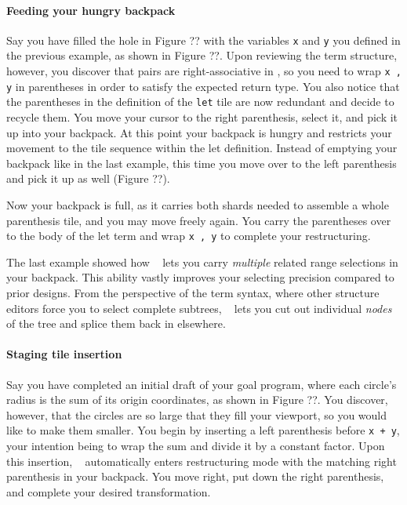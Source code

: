 \paragraph{Feeding your hungry backpack}
Say you have filled the hole in Figure ?? with
the variables \texttt{x} and \texttt{y} you defined
in the previous example, as shown in Figure ??.
Upon reviewing the term structure, however, you
discover that pairs are right-associative in \tylr,
so you need to wrap \texttt{x , y} in parentheses
in order to satisfy the expected return type.
You also notice that the parentheses in the definition
of the \texttt{let} tile are now redundant
and decide to recycle them.
You move your cursor to the right parenthesis,
select it, and pick it up into your backpack.
At this point your backpack is hungry and restricts
your movement to the tile sequence within the
let definition.
Instead of emptying your backpack like in the
last example, this time you move over to the
left parenthesis and pick it up as well (Figure ??).



Now your backpack is full, as it carries both shards
needed to assemble a whole parenthesis tile,
and you may move freely again.
You carry the parentheses over to the body of the
let term and wrap \texttt{x , y} to complete your
restructuring.

The last example showed how \tylr~ lets you carry \emph{multiple}
related range selections in your backpack.
This ability vastly improves your selecting precision
compared to prior designs.
From the perspective of the term syntax,
where other structure editors force you to select
complete subtrees, \tylr~ lets you cut out individual
\emph{nodes} of the tree and splice them back in
elsewhere.

\paragraph{Staging tile insertion}

Say you have completed an initial draft of your goal program,
where each circle's radius is the sum of its origin
coordinates, as shown in Figure ??.
You discover, however, that the circles are so large that
they fill your viewport, so you would like to make them smaller.
You begin by inserting a left parenthesis
before \texttt{x + y}, your intention being to wrap
the sum and divide it by a constant factor.
Upon this insertion, \tylr~ automatically enters
restructuring mode with the matching right parenthesis
in your backpack.
You move right, put down the right parenthesis,
and complete your desired transformation.

